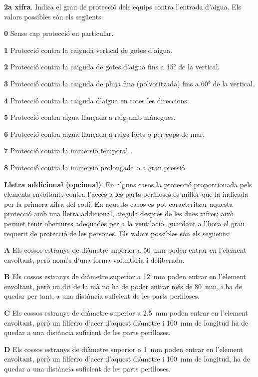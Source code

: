 \textbf{2a xifra}. Indica el grau de protecció dels equips contra
l'entrada d'aigua. Els valors possibles són els següents:
\begin{list}{}
   {\setlength{\labelwidth}{10mm} \setlength{\leftmargin}{10mm} \setlength{\labelsep}{2mm}}
   \item[\textbf{0}] Sense cap protecció en particular.
   \item[\textbf{1}] Protecció contra la caiguda vertical de gotes d'aigua.
   \item[\textbf{2}] Protecció contra la caiguda de gotes d'aigua fins a \ang{15} de la  vertical.
   \item[\textbf{3}] Protecció contra la caiguda de pluja fina (polvoritzada) fins a \ang{60} de la  vertical.
   \item[\textbf{4}] Protecció contra la caiguda d'aigua en totes les direccions.
   \item[\textbf{5}] Protecció contra aigua llançada a raig amb mànegues.
   \item[\textbf{6}] Protecció contra aigua llançada a raigs forts o per cops de mar.
   \item[\textbf{7}] Protecció contra la immersió temporal.
   \item[\textbf{8}] Protecció contra la immersió prolongada o a gran pressió.
\end{list}


\textbf{Lletra addicional (opcional)}. En alguns casos la protecció
proporcionada pels elements envoltants contra l'accés a les parts
perilloses és millor que la indicada per la primera xifra del codi.
En aquests casos es pot caracteritzar aquesta protecció amb una
lletra addicional, afegida després de les dues xifres; això permet
tenir obertures adequades per a la ventilació,  guardant a l'hora el
grau requerit de protecció de les persones. Els valors possibles són
els següents:
\begin{list}{}
   {\setlength{\labelwidth}{10mm} \setlength{\leftmargin}{10mm} \setlength{\labelsep}{2mm}}
   \item[\textbf{A}] Els  cossos estranys de diàmetre superior a
   \SI{50}{mm}    poden entrar en l'element envoltant, però només d'una forma voluntària i deliberada.
   \item[\textbf{B}] Els  cossos estranys de diàmetre superior a \SI{12}{mm}
    poden entrar en l'element envoltant, però un dit de la mà no ha de poder entrar més de \SI{80}{mm}, i
    ha de quedar per tant, a una distància    suficient de les parts perilloses.
   \item[\textbf{C}] Els  cossos estranys de diàmetre superior a \SI{2,5}{mm}
   poden entrar en l'element envoltant, però un filferro d'acer d'aquest diàmetre i \SI{100}{mm}
   de longitud ha de quedar a una distància suficient de les parts perilloses.
   \item[\textbf{D}] Els  cossos estranys de diàmetre superior a \SI{1}{mm}
   poden entrar en l'element envoltant, però un filferro d'acer d'aquest diàmetre i \SI{100}{mm}
   de longitud, ha de quedar a una distància suficient de les parts perilloses.
\end{list}

